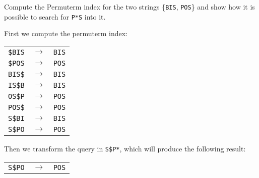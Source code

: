 \exercise

Compute the Permuterm index for the two strings \{\texttt{BIS}, \texttt{POS}\}
and show how it is possible to search for \texttt{P*S} into it.

\solution

First we compute the permuterm index:
%
\begin{table}[H]
  \centering
  \begin{tabular}{ccc}
    \texttt{\$BIS} & $\rightarrow$ & \texttt{BIS} \\
    \texttt{\$POS} & $\rightarrow$ & \texttt{POS} \\
    \texttt{BIS\$} & $\rightarrow$ & \texttt{BIS} \\
    \texttt{IS\$B} & $\rightarrow$ & \texttt{BIS} \\
    \texttt{OS\$P} & $\rightarrow$ & \texttt{POS} \\
    \texttt{POS\$} & $\rightarrow$ & \texttt{POS} \\
    \texttt{S\$BI} & $\rightarrow$ & \texttt{BIS} \\
    \texttt{S\$PO} & $\rightarrow$ & \texttt{POS} \\
  \end{tabular}
\end{table}
%
Then we transform the query in \texttt{S\$P*}, which will produce the following
result:
%
\begin{table}[H]
  \centering
  \begin{tabular}{ccc}
    \texttt{S\$PO} & $\rightarrow$ & \texttt{POS} \\
  \end{tabular}
\end{table}
